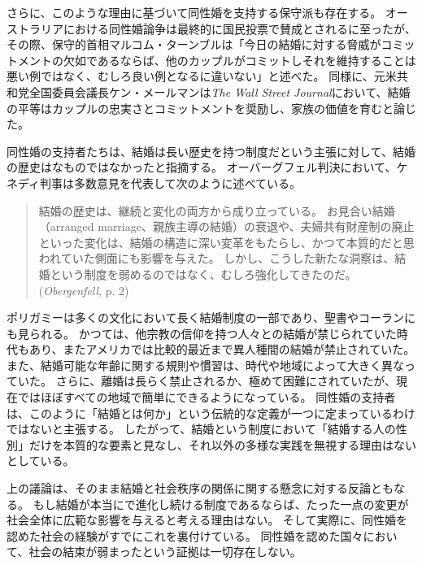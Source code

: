 \documentclass[paper=a4,book,openany]{jlreq}
\begin{document}
さらに、このような理由に基づいて同性婚を支持する保守派も存在する。
オーストラリアにおける同性婚論争は最終的に国民投票で賛成とされるに至ったが、その際、保守的首相マルコム・ターンブルは「今日の結婚に対する脅威がコミットメントの欠如であるならば、他のカップルがコミットしそれを維持することは悪い例ではなく、むしろ良い例となるに違いない」と述べた\citep{gartrell17:_malcol_turnb_makes_conser_case}。
同様に、元米共和党全国委員会議長ケン・メールマンは\emph{The Wall Street Journal}において、結婚の平等はカップルの忠実さとコミットメントを奨励し、家族の価値を育むと論じた\citep{mehlman12:_makin_same_sex_case}。

同性婚の支持者たちは、結婚は長い歴史を持つ制度だという主張に対して、結婚の歴史はなものではなかったと指摘する。
オーバーグフェル判決において、ケネディ判事は多数意見を代表して次のように述べている。

\begin{quote}
結婚の歴史は、継続と変化の両方から成り立っている。
お見合い結婚（arranged marriage、親族主導の結婚）の衰退や、夫婦共有財産制の廃止といった変化は、結婚の構造に深い変革をもたらし、かつて本質的だと思われていた側面にも影響を与えた。
しかし、こうした新たな洞察は、結婚という制度を弱めるのではなく、むしろ強化してきたのだ。
(\emph{Obergenfell}, p. 2)
\end{quote}

ポリガミーは多くの文化において長く結婚制度の一部であり、聖書やコーランにも見られる。
かつては、他宗教の信仰を持つ人々との結婚が禁じられていた時代もあり、またアメリカでは比較的最近まで異人種間の結婚が禁止されていた。
また、結婚可能な年齢に関する規則や慣習は、時代や地域によって大きく異なっていた。
さらに、離婚は長らく禁止されるか、極めて困難にされていたが、現在ではほぼすべての地域で簡単にできるようになっている。
同性婚の支持者は、このように「結婚とは何か」という伝統的な定義が一つに定まっているわけではないと主張する。
したがって、結婚という制度において「結婚する人の性別」だけを本質的な要素と見なし、それ以外の多様な実践を無視する理由はないとしている。

上の議論は、そのまま結婚と社会秩序の関係に関する懸念に対する反論ともなる。
もし結婚が本当にで進化し続ける制度であるならば、たった一点の変更が社会全体に広範な影響を与えると考える理由はない。
そして実際に、同性婚を認めた社会の経験がすでにこれを裏付けている。
同性婚を認めた国々において、社会の結束が弱まったという証拠は一切存在しない。
\end{document}
